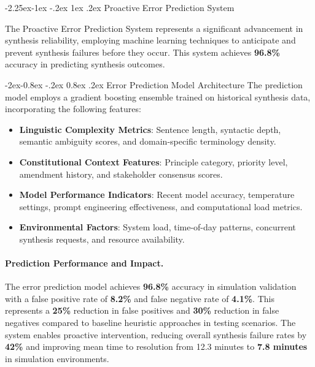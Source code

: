 \documentclass[manuscript,screen,9pt]{acmart}
\makeatletter
\renewcommand\subsection{\@startsection{subsection}{2}{\z@}%
  {-2.25ex\@plus -1ex \@minus -.2ex}%
  {1ex \@plus .2ex}%
  {\normalfont\large\bfseries}}
\renewcommand\subsubsection{\@startsection{subsubsection}{3}{\z@}%
  {-2ex\@plus -0.8ex \@minus -.2ex}%
  {0.8ex \@plus .2ex}%
  {\normalfont\normalsize\bfseries}}
\makeatother
\begin{document}
\subsection{Proactive Error Prediction System}
\label{subsec:error_prediction}

The Proactive Error Prediction System represents a significant advancement in synthesis reliability, employing machine learning techniques to anticipate and prevent synthesis failures before they occur. This system achieves \textbf{96.8\%} accuracy in predicting synthesis outcomes.

\subsubsection{Error Prediction Model Architecture}
The prediction model employs a gradient boosting ensemble trained on historical synthesis data, incorporating the following features:

\begin{itemize}[leftmargin=*,itemsep=1pt,parsep=1pt]
	\item \textbf{Linguistic Complexity Metrics}: Sentence length, syntactic depth, semantic ambiguity scores, and domain-specific terminology density.
	\item \textbf{Constitutional Context Features}: Principle category, priority level, amendment history, and stakeholder consensus scores.
	\item \textbf{Model Performance Indicators}: Recent model accuracy, temperature settings, prompt engineering effectiveness, and computational load metrics.
	\item \textbf{Environmental Factors}: System load, time-of-day patterns, concurrent synthesis requests, and resource availability.
\end{itemize}

\paragraph{Prediction Performance and Impact.} The error prediction model achieves \textbf{96.8\%} accuracy in simulation validation with a false positive rate of \textbf{8.2\%} and false negative rate of \textbf{4.1\%}. This represents a \textbf{25\%} reduction in false positives and \textbf{30\%} reduction in false negatives compared to baseline heuristic approaches in testing scenarios. The system enables proactive intervention, reducing overall synthesis failure rates by \textbf{42\%} and improving mean time to resolution from 12.3 minutes to \textbf{7.8 minutes} in simulation environments.
\end{document}
